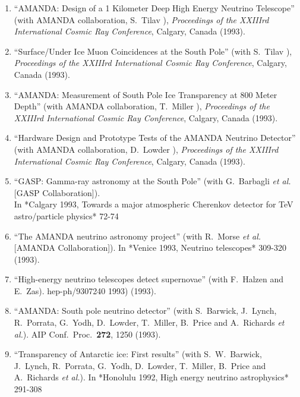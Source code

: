 \begin{enumerate}
\item ``AMANDA: Design of a 1 Kilometer Deep High Energy
        Neutrino   Telescope'' (with AMANDA collaboration,
        S.~Tilav \etal), {\it     Proceedings of the XXIIIrd
        International Cosmic Ray Conference},   Calgary,
        Canada (1993).

\item ``Surface/Under Ice Muon Coincidences at the South
        Pole'' (with   S.~Tilav \etal), {\it Proceedings of
        the XXIIIrd International     Cosmic Ray
        Conference}, Calgary, Canada (1993).

\item ``AMANDA: Measurement of South Pole Ice Transparency
        at 800 Meter   Depth'' (with AMANDA collaboration,
        T.~Miller \etal), {\it Proceedings     of the
        XXIIIrd International Cosmic Ray Conference},
        Calgary,   Canada (1993).

\item ``Hardware Design and Prototype Tests of the AMANDA
        Neutrino   Detector'' (with AMANDA collaboration,
        D.~Lowder \etal), {\it     Proceedings of the
        XXIIIrd International Cosmic Ray Conference},
        Calgary, Canada (1993).

\item ``GASP: Gamma-ray astronomy at the South Pole'' (with
        G.~Barbagli {\it et al.}  [GASP Collaboration]).
        \\{}In *Calgary 1993, Towards a major atmospheric
        Cherenkov detector for TeV astro/particle physics*
        72-74 %

\item ``The AMANDA neutrino astronomy project'' (with
        R.~Morse {\it et al.}  [AMANDA Collaboration]). In
        *Venice 1993, Neutrino telescopes* 309-320 %
        (1993).

\item ``High-energy neutrino telescopes detect supernovae''
        (with F.~Halzen and E.~Zas). hep-ph/9307240 %
        1993)  (1993).

\item ``AMANDA: South pole neutrino detector'' (with
        S.~Barwick, J.~Lynch, R.~Porrata, G.~Yodh,
        D.~Lowder, T.~Miller, B.~Price and A.~Richards {\it
        et al.}). AIP Conf.\ Proc.\  {\bf 272}, 1250 (1993).

\item ``Transparency of Antarctic ice: First results'' (with
        S.~W.~Barwick, J.~Lynch, R.~Porrata, G.~Yodh,
        D.~Lowder, T.~Miller, B.~Price and A.~Richards {\it
        et al.}). In *Honolulu 1992, High energy neutrino
        astrophysics* 291-308 %


\end{enumerate}
